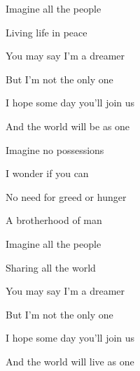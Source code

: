 \begin{song}
 Imagine all the people  \par
{}Living life in peace \par

\bigskip

 You may say I'm a dreamer  \par
{} But I'm not the only one   \par
{} I hope some day you'll join us  \par
{} And the world will be as one \par

\bigskip

 Imagine no possessions \par
{} I wonder if you   can  \par
{} No need for greed or hunger \par
{} A brotherhood of man \par

\bigskip

 Imagine all the people  \par
{}Sharing all the world \par

\bigskip

 You may say I'm a dreamer  \par
{} But I'm not the only one   \par
{} I hope some day you'll join us  \par
{} And the world will live as one \par

\end{song}
